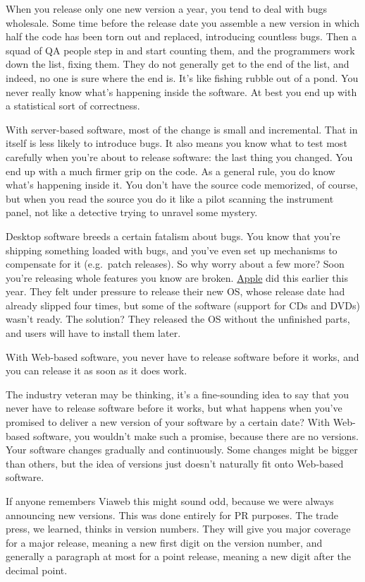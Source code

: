 When you release only one new version a year, you tend to deal with bugs
wholesale. Some time before the release date you assemble a new version
in which half the code has been torn out and replaced, introducing
countless bugs. Then a squad of QA people step in and start counting
them, and the programmers work down the list, fixing them. They do not
generally get to the end of the list, and indeed, no one is sure where
the end is. It's like fishing rubble out of a pond. You never really
know what's happening inside the software. At best you end up with a
statistical sort of correctness.

With server-based software, most of the change is small and incremental.
That in itself is less likely to introduce bugs. It also means you know
what to test most carefully when you're about to release software: the
last thing you changed. You end up with a much firmer grip on the code.
As a general rule, you do know what's happening inside it. You don't
have the source code memorized, of course, but when you read the source
you do it like a pilot scanning the instrument panel, not like a
detective trying to unravel some mystery.

Desktop software breeds a certain fatalism about bugs. You know that
you're shipping something loaded with bugs, and you've even set up
mechanisms to compensate for it (e.g.~patch releases). So why worry
about a few more? Soon you're releasing whole features you know are
broken. \href{http://news.cnet.com/news/0-1006-200-5195914.html}{Apple}
did this earlier this year. They felt under pressure to release their
new OS, whose release date had already slipped four times, but some of
the software (support for CDs and DVDs) wasn't ready. The solution? They
released the OS without the unfinished parts, and users will have to
install them later.

With Web-based software, you never have to release software before it
works, and you can release it as soon as it does work.

The industry veteran may be thinking, it's a fine-sounding idea to say
that you never have to release software before it works, but what
happens when you've promised to deliver a new version of your software
by a certain date? With Web-based software, you wouldn't make such a
promise, because there are no versions. Your software changes gradually
and continuously. Some changes might be bigger than others, but the idea
of versions just doesn't naturally fit onto Web-based software.

If anyone remembers Viaweb this might sound odd, because we were always
announcing new versions. This was done entirely for PR purposes. The
trade press, we learned, thinks in version numbers. They will give you
major coverage for a major release, meaning a new first digit on the
version number, and generally a paragraph at most for a point release,
meaning a new digit after the decimal point.

